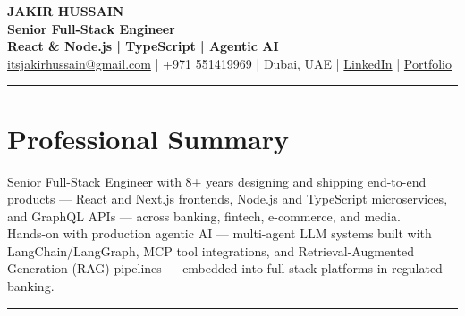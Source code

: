 \documentclass[10pt,a4paper]{article}
\newcommand{\NameSize}{\fontsize{22}{24}\selectfont}
\newcommand{\TitleSize}{\fontsize{10.8}{13}\selectfont}
\newcommand{\TagSize}{\fontsize{10}{12}\selectfont}
\newcommand{\BodySize}{\fontsize{9.7}{12}\selectfont}
\newcommand{\SmallBody}{\fontsize{9.2}{11.4}\selectfont}
\newcommand{\topdivider}{\color{rulecolor}\rule{\linewidth}{0.5pt}\color{primary}\vspace{0pt}}
\newcommand{\ATSspaceoff}{\ifdefined\pdfinterwordspaceoff\pdfinterwordspaceoff\fi}
\newcommand{\ATSspaceon}{\ifdefined\pdfinterwordspaceon\pdfinterwordspaceon\fi}
\begin{document}
\BodySize

\begin{center}

{\ATSspaceoff\NameSize \bfseries JAKIR HUSSAIN\ATSspaceon}\\[4pt]
{\TitleSize \bfseries Senior Full-Stack Engineer}\\[2pt]
{\TagSize \bfseries React \& Node.js \;|\; TypeScript \;|\; Agentic AI}\\[6pt]

\href{mailto:itsjakirhussain@gmail.com}{itsjakirhussain@gmail.com} \;|\;
+971 551419969 \;|\;
Dubai, UAE \;|\;
\href{https://linkedin.com/in/iam-hussain}{LinkedIn} \;|\;
\href{https://iam-hussain.site}{Portfolio}

\end{center}
\vspace{-8pt}
\topdivider
\vspace{2pt}
\section*{Professional Summary}
\SmallBody
Senior Full-Stack Engineer with 8+ years designing and shipping end-to-end products — React and Next.js frontends, Node.js and TypeScript microservices, and GraphQL APIs — across banking, fintech, e-commerce, and media.\\[5pt]

Hands-on with production agentic AI — multi-agent LLM systems built with LangChain/LangGraph, MCP tool integrations, and Retrieval-Augmented Generation (RAG) pipelines — embedded into full-stack platforms in regulated banking.\\[8pt]

\vspace{-8pt}
\topdivider
\vspace{2pt}
\end{document}
